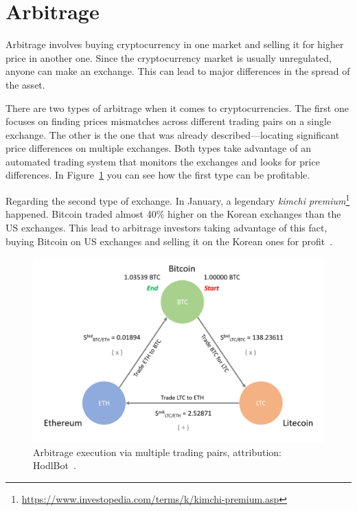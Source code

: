 \section{Arbitrage}
Arbitrage involves buying cryptocurrency in one market and selling it for higher price in another one. Since the cryptocurrency market is usually unregulated, anyone can make an exchange. This can lead to major differences in the spread of the asset.

There are two types of arbitrage when it comes to cryptocurrencies. The first one focuses on finding prices mismatches across different trading pairs on a single exchange. The other is the one that was already described---locating significant price differences on multiple exchanges. Both types take advantage of an automated trading system that monitors the exchanges and looks for price differences. In Figure~\ref{arbitrage-figure} you can see how the first type can be profitable.

Regarding the second type of exchange. In January, a legendary \emph{kimchi premium}\footnote{\url{https://www.investopedia.com/terms/k/kimchi-premium.asp}} happened. Bitcoin traded almost 40\% higher on the Korean exchanges than the US exchanges. This lead to arbitrage investors taking advantage of this fact, buying Bitcoin on US exchanges and selling it on the Korean ones for profit~\cite{hodlbot:day-trading-cryptocurrency}.

\begin{figure}[!hbt]
    \centering
    \includegraphics[width=\columnwidth]{figures/arbitrage.png}
    \caption{Arbitrage execution via multiple trading pairs, attribution: HodlBot~\cite{hodlbot:day-trading-cryptocurrency}.}
    \label{arbitrage-figure}
\end{figure}

